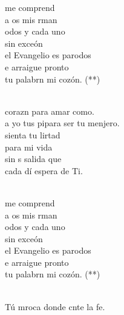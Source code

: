 \documentclass[12pt]{article}
\begin{document}
\begin{multicols*}{2}
\begin{cancion}%
	\begin{chorus}%
	me comprend \\
	a os mis rman  \\
	odos y cada uno\\
	sin exceón  \\
	el Evangelio es parodos\\
	e arraigue pronto\\
	tu palabrn mi cozón. (**)\\
	\end{chorus}%
	\jump\\
	 corazn para amar como. \\
	a yo tus pipara ser tu menjero.\\
	 sienta tu lirtad\\
	para  mi vida\\
	sin s salida que\\
	cada dí espera de Ti.\\\jump\\
	\begin{chorus}%
	me comprend \\
	a os mis rman  \\
	odos y cada uno\\
	sin exceón  \\
	el Evangelio es parodos\\
	e arraigue pronto\\
	tu palabrn mi cozón. (**)\\
	\end{chorus}%
	\jump\\
	 Tú mroca donde cnte la fe.\\

\end{cancion}
\end{multicols*}
\end{document}
